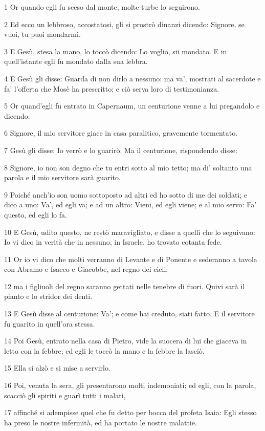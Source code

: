 \par 1 Or quando egli fu sceso dal monte, molte turbe lo seguirono.
\par 2 Ed ecco un lebbroso, accostatosi, gli si prostrò dinanzi dicendo: Signore, se vuoi, tu puoi mondarmi.
\par 3 E Gesù, stesa la mano, lo toccò dicendo: Lo voglio, sii mondato. E in quell'istante egli fu mondato dalla sua lebbra.
\par 4 E Gesù gli disse: Guarda di non dirlo a nessuno: ma va', mostrati al sacerdote e fa' l'offerta che Mosè ha prescritto; e ciò serva loro di testimonianza.
\par 5 Or quand'egli fu entrato in Capernaum, un centurione venne a lui pregandolo e dicendo:
\par 6 Signore, il mio servitore giace in casa paralitico, gravemente tormentato.
\par 7 Gesù gli disse: Io verrò e lo guarirò. Ma il centurione, rispondendo disse:
\par 8 Signore, io non son degno che tu entri sotto al mio tetto; ma di' soltanto una parola e il mio servitore sarà guarito.
\par 9 Poiché anch'io son uomo sottoposto ad altri ed ho sotto di me dei soldati; e dico a uno: Va', ed egli va; e ad un altro: Vieni, ed egli viene; e al mio servo: Fa' questo, ed egli lo fa.
\par 10 E Gesù, udito questo, ne restò maravigliato, e disse a quelli che lo seguivano: Io vi dico in verità che in nessuno, in Israele, ho trovato cotanta fede.
\par 11 Or io vi dico che molti verranno di Levante e di Ponente e sederanno a tavola con Abramo e Isacco e Giacobbe, nel regno dei cieli;
\par 12 ma i figliuoli del regno saranno gettati nelle tenebre di fuori. Quivi sarà il pianto e lo stridor dei denti.
\par 13 E Gesù disse al centurione: Va'; e come hai creduto, siati fatto. E il servitore fu guarito in quell'ora stessa.
\par 14 Poi Gesù, entrato nella casa di Pietro, vide la suocera di lui che giaceva in letto con la febbre; ed egli le toccò la mano e la febbre la lasciò.
\par 15 Ella si alzò e si mise a servirlo.
\par 16 Poi, venuta la sera, gli presentarono molti indemoniati; ed egli, con la parola, scacciò gli spiriti e guarì tutti i malati,
\par 17 affinché si adempisse quel che fu detto per bocca del profeta Isaia: Egli stesso ha preso le nostre infermità, ed ha portato le nostre malattie.

